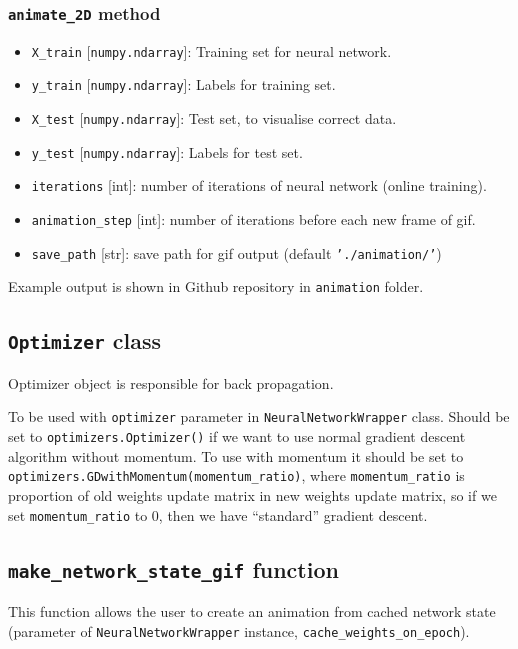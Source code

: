 \documentclass[a4]{article}
\begin{document}
\subsubsection{\texttt{animate\_2D} method}
\begin{itemize}
    \item \texttt{X\_train} [\texttt{numpy.ndarray}]: Training set for neural network.
    \item \texttt{y\_train} [\texttt{numpy.ndarray}]: Labels for training set.
    \item \texttt{X\_test} [\texttt{numpy.ndarray}]: Test set, to visualise correct data.
    \item \texttt{y\_test} [\texttt{numpy.ndarray}]: Labels for test set.
    \item \texttt{iterations} [int]: number of iterations of neural network (online training).
    \item \texttt{animation\_step} [int]: number of iterations before each new frame of gif. 
    \item \texttt{save\_path} [str]: save path for gif output (default \texttt{'./animation/'})
\end{itemize}
Example output is shown in Github repository in \texttt{animation} folder.

\newpage
\subsection{\texttt{Optimizer} class}
Optimizer object is responsible for back propagation.

To be used with \texttt{optimizer} parameter in \texttt{NeuralNetworkWrapper} class. Should be set to \texttt{optimizers.Optimizer()} if we want to use normal gradient descent algorithm without momentum. To use with momentum it should be set to \texttt{optimizers.GDwithMomentum(momentum\_ratio)}, where \texttt{momentum\_ratio} is proportion of old weights update matrix in new weights update matrix, so if we set \texttt{momentum\_ratio} to 0, then we have ``standard'' gradient descent. 

\subsection{\texttt{make\_network\_state\_gif} function}

This function allows the user to create an animation from cached network state (parameter of \texttt{NeuralNetworkWrapper} instance, \texttt{cache\_weights\_on\_epoch}).
\end{document}
